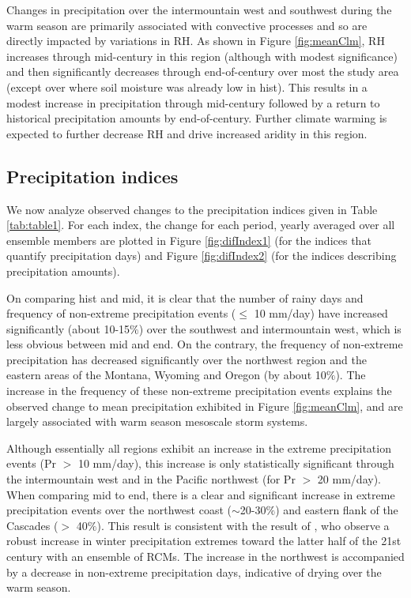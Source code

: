 \documentclass{ametsoc}
\begin{document}
Changes in precipitation over the intermountain west and southwest during the warm season are primarily associated with convective processes and so are directly impacted by variations in RH.  As shown in Figure \ref{fig:meanClm}, RH increases through mid-century in this region (although with modest significance) and then significantly decreases through end-of-century over most the study area (except over where soil moisture was already low in \textsf{hist}).  This results in a modest increase in precipitation through mid-century followed by a return to historical precipitation amounts by end-of-century.  Further climate warming is expected to further decrease RH and drive increased aridity in this region.


\subsection{Precipitation indices}


We now analyze observed changes to the precipitation indices given in Table \ref{tab:table1}.  For each index, the change for each period, yearly averaged over all ensemble members are plotted in Figure \ref{fig:difIndex1} (for the indices that quantify precipitation days) and Figure \ref{fig:difIndex2} (for the indices describing precipitation amounts).


On comparing \textsf{hist} and \textsf{mid}, it is clear that the number of rainy days and frequency of non-extreme precipitation events ($\leq$ 10 mm/day) have increased significantly (about 10-15$\%$) over the southwest and intermountain west, which is less obvious between \textsf{mid} and \textsf{end}. On the contrary, the frequency of non-extreme precipitation has decreased significantly over the northwest region and the eastern areas of the Montana, Wyoming and Oregon (by about 10$\%$).  The increase in the frequency of these non-extreme precipitation events explains the observed change to mean precipitation exhibited in Figure \ref{fig:meanClm}, and are largely associated with warm season mesoscale storm systems.


Although essentially all regions exhibit an increase in the extreme precipitation events (Pr $>$ 10 mm/day), this increase is only statistically significant through the intermountain west and in the Pacific northwest (for Pr $>$ 20 mm/day).  When comparing \textsf{mid} to \textsf{end}, there is a clear and significant increase in extreme precipitation events over the northwest coast ($\sim$20-30$\%$) and eastern flank of the Cascades ($>$ 40$\%$). This result is consistent with the result of \cite{dominguez2012changes}, who observe a robust increase in winter precipitation extremes toward the latter half of the 21st century with an ensemble of RCMs.  The increase in the northwest is accompanied by a decrease in non-extreme precipitation days, indicative of drying over the warm season.  
\end{document}
